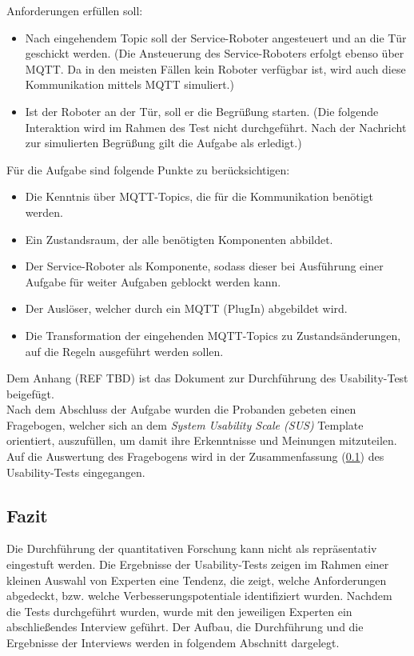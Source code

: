         Anforderungen erfüllen soll: 
        \begin{itemize}
            \item Nach eingehendem Topic soll der Service-Roboter angesteuert und an die Tür geschickt werden. 
            (Die Ansteuerung des Service-Roboters erfolgt ebenso über \acs{MQTT}. Da in den meisten Fällen kein Roboter verfügbar ist, wird auch 
            diese Kommunikation mittels \acs{MQTT} simuliert.)
            \item Ist der Roboter an der Tür, soll er die Begrüßung starten. (Die folgende Interaktion wird im Rahmen des Test nicht durchgeführt. 
            Nach der Nachricht zur simulierten Begrüßung gilt die Aufgabe als erledigt.)
        \end{itemize}
        Für die Aufgabe sind folgende Punkte zu berücksichtigen:
        \begin{itemize}
            \item Die Kenntnis über \acs{MQTT}-Topics, die für die Kommunikation benötigt werden.
            \item Ein Zustandsraum, der alle benötigten Komponenten abbildet.
            \item Der Service-Roboter als Komponente, sodass dieser bei Ausführung einer Aufgabe für weiter Aufgaben geblockt werden kann. 
            \item Der Auslöser, welcher durch ein \acs{MQTT} (PlugIn) abgebildet wird.
            \item Die Transformation der eingehenden \acs{MQTT}-Topics zu Zustandsänderungen, auf die Regeln ausgeführt werden sollen.
        \end{itemize}
        Dem Anhang (REF TBD) ist das Dokument zur Durchführung des Usability-Test beigefügt. 
        \\
        \linebreak
        Nach dem Abschluss der Aufgabe wurden die Probanden gebeten einen Fragebogen, welcher sich an dem \textit{System Usability Scale (SUS)} 
        Template orientiert, auszufüllen, um damit ihre Erkenntnisse und Meinungen mitzuteilen. Auf die Auswertung des Fragebogens wird in der 
        Zusammenfassung (\ref{subsec:usabilityFazit}) des Usability-Tests eingegangen. 

    \subsection{Fazit}
    \label{subsec:usabilityFazit}
        Die Durchführung der quantitativen Forschung kann nicht als repräsentativ eingestuft werden. Die Ergebnisse der 
        Usability-Tests zeigen im Rahmen einer kleinen Auswahl von Experten eine Tendenz, die zeigt, welche Anforderungen abgedeckt, bzw. 
        welche Verbesserungspotentiale identifiziert wurden. 
        Nachdem die Tests durchgeführt wurden, wurde 
        mit den jeweiligen Experten ein abschließendes Interview geführt. Der Aufbau, die Durchführung und die Ergebnisse der Interviews 
        werden in folgendem Abschnitt dargelegt.

